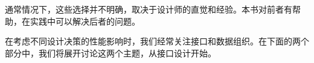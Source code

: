 通常情况下，这些选择并不明确，取决于设计师的直觉和经验。本书对前者有帮助，在实践中可以解决后者的问题。 

在考虑不同设计决策的性能影响时，我们经常关注接口和数据组织。在下面的两个部分中，我们将展开讨论这两个主题，从接口设计开始。








